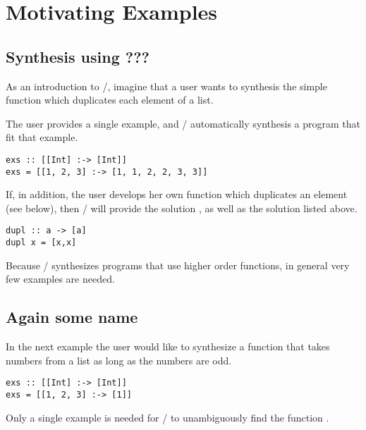 \section{Motivating Examples} 
\label{examples}

\subsection{Synthesis using ???}

As an introduction to \ourTool/, imagine that a user wants to synthesis the simple  \cite{Osera:2015} function which duplicates each element of a list.


The user provides a single example, and \ourTool/ automatically synthesis a program  that fit that example.

\begin{lstlisting}
exs :: [[Int] :-> [Int]]
exs = [[1, 2, 3] :-> [1, 1, 2, 2, 3, 3]]
\end{lstlisting}

If, in addition, the user develops her own function  which duplicates an element (see below), then \ourTool/ will provide the solution , as well as the solution listed above.

\begin{lstlisting}
dupl :: a -> [a]
dupl x = [x,x]
\end{lstlisting}

Because \ourTool/ synthesizes programs that use higher order functions, in general very few examples are needed. 


\subsection{Again some name}

In the next example the user would like to synthesize a function that takes numbers from a list as long as the numbers are odd. 

\begin{lstlisting}
exs :: [[Int] :-> [Int]]
exs = [[1, 2, 3] :-> [1]]
\end{lstlisting}

Only a single example is needed for \ourTool/ to unambiguously find the function .


